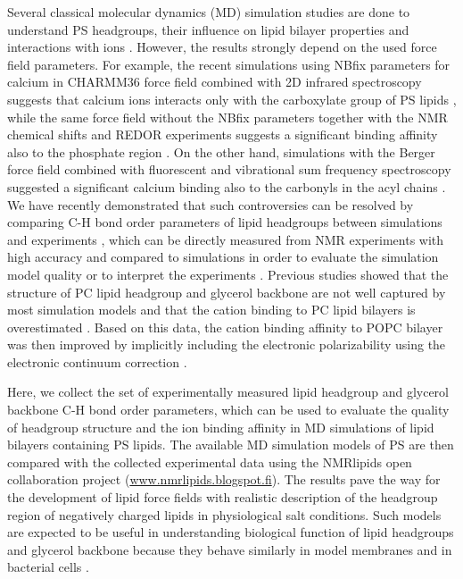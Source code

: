 \documentclass[aps,prl,superscriptaddress,twocolumn]{revtex4}
\begin{document}
Several classical molecular dynamics (MD) simulation studies are done
to understand PS headgroups, their influence on lipid bilayer properties and
interactions with
ions \cite{cascales96,pandit02,mukhopadhyay04,pedersen06,vernier09,boettcher11,molina12,jurkiewicz12,venable13,pan14,vangaveti14,melcrova16,valentine18,hallock18}.
However, the results strongly depend on the used force field parameters.
For example, the recent simulations using NBfix parameters for calcium \cite{kim16} in
CHARMM36 force field \cite{klauda10,venable13} combined with 2D infrared spectroscopy
suggests that calcium ions interacts only with the carboxylate group of PS lipids \cite{valentine18}, while
the same force field without the NBfix parameters together with the NMR chemical shifts and
REDOR experiments suggests a significant binding affinity also to the phosphate region \cite{hallock18}.
On the other hand, simulations with the Berger force field \cite{berger97,mukhopadhyay04}
combined with fluorescent and vibrational sum frequency spectroscopy suggested a significant
calcium binding also to the carbonyls in the acyl chains \cite{melcrova16}. 
We have recently demonstrated that such controversies can be resolved by
comparing C-H bond order parameters of lipid headgroups between simulations
and experiments \cite{botan15,catte16}, which can be directly
measured from NMR experiments with high accuracy and compared to simulations
in order to evaluate the simulation model quality or to interpret the experiments \cite{ollila16}.
Previous studies showed that the structure of PC lipid headgroup and glycerol backbone are not well
captured by most simulation models \cite{botan15} and that the cation binding to PC
lipid bilayers is overestimated \cite{catte16}. Based on this data, the cation binding
affinity to POPC bilayer was then improved by implicitly including the electronic polarizability
using the electronic continuum correction \cite{melcr18}.

Here, we collect the set of experimentally measured lipid headgroup and
glycerol backbone C-H bond order parameters, which can be used to
evaluate the quality of headgroup structure and the ion binding affinity
in MD simulations of lipid bilayers containing PS lipids. 
The available MD simulation models of PS are then compared with
the collected experimental data using the NMRlipids open collaboration
project (\url{www.nmrlipids.blogspot.fi}). The results pave the way
for the development of lipid force fields with realistic description of
the headgroup region of negatively charged lipids in physiological salt
conditions. Such models are expected to be useful in understanding
biological function of lipid headgroups and glycerol backbone because
they behave similarly in model membranes and in bacterial cells \cite{gally81,scherer87,seelig90}.
\end{document}

